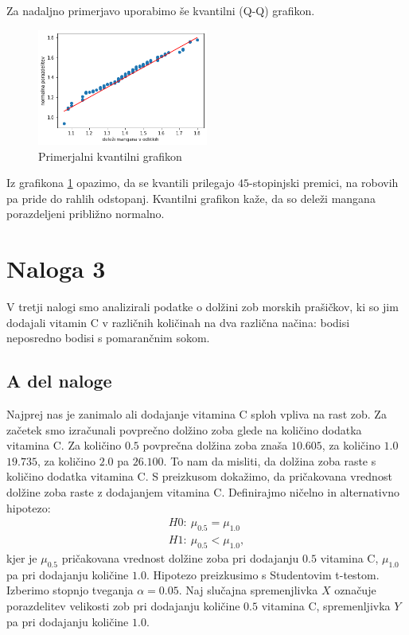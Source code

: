 \documentclass{article}
\begin{document}
Za nadaljno primerjavo uporabimo še kvantilni (Q-Q) grafikon. 
\begin{figure}[H]
    \begin{center}
        \includegraphics*[width=0.5\textwidth]{figure2C.png}
        \caption{Primerjalni kvantilni grafikon}
        \label{2C}
    \end{center}
\end{figure}

Iz grafikona \ref{2C} opazimo, da se kvantili prilegajo $45$-stopinjski premici, na robovih pa pride do 
rahlih odstopanj. Kvantilni grafikon kaže, da so deleži mangana porazdeljeni približno normalno.

\section{Naloga 3}
V tretji nalogi smo analizirali
podatke o dolžini zob morskih prašičkov, ki so jim
dodajali vitamin C v različnih količinah na dva različna načina: bodisi neposredno
bodisi s pomarančnim sokom.

\subsection{A del naloge}
Najprej nas je zanimalo ali dodajanje vitamina C sploh vpliva na rast zob. Za začetek smo izračunali
povprečno dolžino zoba glede na količino dodatka vitamina C. Za količino $0.5$ povprečna dolžina zoba znaša
$10.605$, za količino $1.0$ $19.735$, za količino $2.0$ pa $26.100$. To nam da misliti, da dolžina zoba raste 
s količino dodatka vitamina C.
S preizkusom dokažimo, da pričakovana vrednost dolžine zoba raste z dodajanjem vitamina C.
Definirajmo ničelno in alternativno
hipotezo:
\begin{align}
    H0: \ \mu_{0.5} = \mu_{1.0} \\
    H1: \ \mu_{0.5} < \mu_{1.0},
\end{align}
kjer je $\mu_{0.5}$ pričakovana vrednost dolžine zoba pri dodajanju $0.5$ vitamina C, 
$\mu_{1.0}$ pa pri dodajanju količine $1.0$.
Hipotezo preizkusimo s Studentovim t-testom. 
Izberimo stopnjo tveganja $\alpha=0.05$.
Naj slučajna spremenjlivka $X$ označuje porazdelitev velikosti zob pri dodajanju količine $0.5$ vitamina C,
spremenljivka $Y$ pa pri dodajanju količine $1.0$. 
\end{document}
